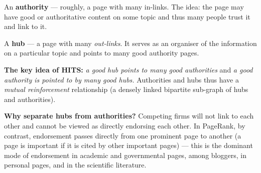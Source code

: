 \documentclass[11pt,a4paper]{article}
\theoremstyle{definition}
\begin{document}
\begin{defbox}
An \textbf{authority} --- roughly, a page with many in-links. The idea: the page may have good or
authoritative content on some topic and thus many people trust it and link to it.

A \textbf{hub} --- a page with many \emph{out-links}. It serves as an organiser of the information on
a particular topic and points to many good authority pages.

\textbf{The key idea of HITS:} \emph{a good hub points to many good authorities} and \emph{a good
authority is pointed to by many good hubs.} Authorities and hubs thus have a \emph{mutual
reinforcement} relationship (a densely linked bipartite sub-graph of hubs and authorities).

\textbf{Why separate hubs from authorities?} Competing firms will not link to each other and cannot be
viewed as directly endorsing each other. In PageRank, by contrast, endorsement passes directly from
one prominent page to another (a page is important if it is cited by other important pages) --- this
is the dominant mode of endorsement in academic and governmental pages, among bloggers, in personal
pages, and in the scientific literature.
\end{defbox}
\end{document}
